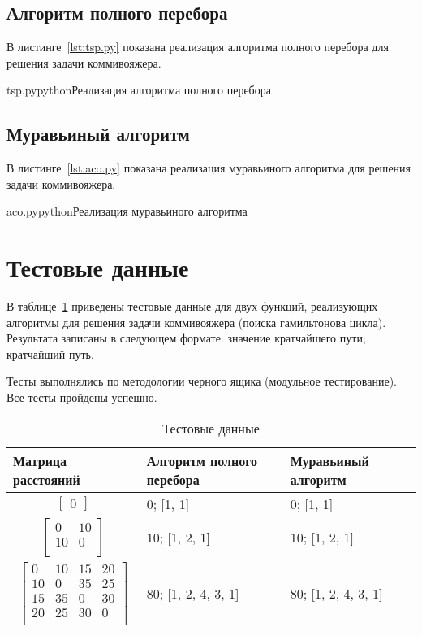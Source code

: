 \subsection{Алгоритм полного перебора}

В листинге~\ref{lst:tsp.py} показана реализация алгоритма полного перебора для решения задачи коммивояжера.

{tsp.py}{python}{Реализация алгоритма полного перебора}

\pagebreak
\subsection{Муравьиный алгоритм}

В листинге~\ref{lst:aco.py} показана реализация муравьиного алгоритма для решения задачи коммивояжера.

{aco.py}{python}{Реализация муравьиного алгоритма}

\section{Тестовые данные}

В таблице~\ref{tabular:testsdata} приведены тестовые данные для двух функций, реализующих алгоритмы для решения задачи коммивояжера (поиска гамильтонова цикла). 
Результата записаны в следующем формате: значение кратчайшего пути; кратчайший путь.

Тесты выполнялись по методологии черного ящика (модульное тестирование). 
Все тесты пройдены успешно.

\begin{table}[H]
\caption{Тестовые данные}
\label{tabular:testsdata}
\begin{tabular}{|p{6cm}|p{5cm}|p{4cm}|}
\hline
\textbf{Матрица расстояний} & \textbf{Алгоритм полного перебора} & \textbf{Муравьиный алгоритм}
\tabularnewline
\hline
\begin{equation*}
\begin{bmatrix}
0
\end{bmatrix}
\end{equation*} & 0; [1, 1] & 0; [1, 1]
\tabularnewline
\hline
\begin{equation*}
\begin{bmatrix}
0 & 10 \\
10 & 0 \\
\end{bmatrix}
\end{equation*} & 10; [1, 2, 1] & 10; [1, 2, 1]
\tabularnewline
\hline
\begin{equation*}
\begin{bmatrix}
0 & 10 & 15 & 20 \\
10 & 0 & 35 & 25 \\
15 & 35 & 0 & 30 \\
20 & 25 & 30 & 0 \\
\end{bmatrix}
\end{equation*} & 80; [1, 2, 4, 3, 1] & 80; [1, 2, 4, 3, 1]
\tabularnewline
\hline
\end{tabular}
\end{table}

